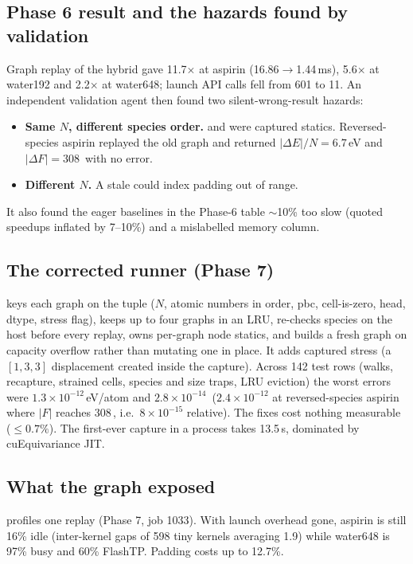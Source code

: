 \subsection{Phase 6 result and the hazards found by validation}
Graph replay of the hybrid gave 11.7$\times$ at aspirin (16.86$\to$1.44\,ms), 5.6$\times$ at water192 and 2.2$\times$ at water648; launch API calls fell from 601 to 11. An independent validation agent then found two silent-wrong-result hazards:
\begin{itemize}
  \item \textbf{Same $N$, different species order.}  and  were captured statics. Reversed-species aspirin replayed the old graph and returned $|\Delta E|/N=6.7$\,eV and $|\Delta F|=308$\,\eVA{} with no error.
  \item \textbf{Different $N$.} A stale  could index padding  out of range.
\end{itemize}
It also found the eager baselines in the Phase-6 table $\sim$10\% too slow (quoted speedups inflated by 7--10\%) and a mislabelled memory column.

\subsection{The corrected runner (Phase 7)}
 keys each graph on the tuple ($N$, atomic numbers in order, pbc, cell-is-zero, head, dtype, stress flag), keeps up to four graphs in an LRU, re-checks species on the host before every replay, owns per-graph node statics, and builds a fresh graph on capacity overflow rather than mutating one in place. It adds captured stress (a $[1,3,3]$ displacement created inside the capture). Across 142 test rows (walks, recapture, strained cells, species and size traps, LRU eviction) the worst errors were $1.3\times10^{-12}$\,eV/atom and $2.8\times10^{-14}$\,\eVA{} ($2.4\times10^{-12}$ at reversed-species aspirin where $|F|$ reaches 308\,\eVA, i.e.\ $8\times10^{-15}$ relative). The fixes cost nothing measurable ($\le0.7\%$). The first-ever capture in a process takes 13.5\,s, dominated by cuEquivariance JIT.

\subsection{What the graph exposed}
 profiles one replay (Phase 7, job 1033). With launch overhead gone, aspirin is still 16\% idle (inter-kernel gaps of 598 tiny kernels averaging 1.9\us) while water648 is 97\% busy and 60\% FlashTP. Padding costs up to 12.7\%.

